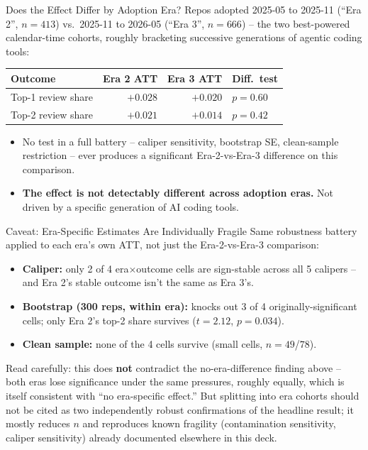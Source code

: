 \begin{frame}{Does the Effect Differ by Adoption Era?}
Repos adopted 2025-05 to 2025-11 (``Era 2'', $n{=}413$) vs.\
2025-11 to 2026-05 (``Era 3'', $n{=}666$) -- the two best-powered
calendar-time cohorts, roughly bracketing successive generations of
agentic coding tools:
\begin{table}
\centering
\small
\begin{tabular}{lrrl}
\toprule
Outcome & Era 2 ATT & Era 3 ATT & Diff.\ test \\
\midrule
Top-1 review share & $+0.028$ & $+0.020$ & $p=0.60$ \\
Top-2 review share & $+0.021$ & $+0.014$ & $p=0.42$ \\
\bottomrule
\end{tabular}
\end{table}
\begin{itemize}
  \item No test in a full battery -- caliper sensitivity, bootstrap
        SE, clean-sample restriction -- ever produces a significant
        Era-2-vs-Era-3 difference on this comparison.
  \item \textbf{The effect is not detectably different across adoption
        eras.} Not driven by a specific generation of AI coding tools.
\end{itemize}
\end{frame}

\begin{frame}{Caveat: Era-Specific Estimates Are Individually Fragile}
Same robustness battery applied to each era's own ATT, not just the
Era-2-vs-Era-3 comparison:
\begin{itemize}
  \item \textbf{Caliper:} only 2 of 4 era$\times$outcome cells are
        sign-stable across all 5 calipers -- and Era 2's stable
        outcome isn't the same as Era 3's.
  \item \textbf{Bootstrap (300 reps, within era):} knocks out 3 of 4
        originally-significant cells; only Era 2's top-2 share
        survives ($t=2.12$, $p=0.034$).
  \item \textbf{Clean sample:} none of the 4 cells survive (small
        cells, $n{=}49$/$78$).
\end{itemize}
\vspace{0.3em}
Read carefully: this does \textbf{not} contradict the no-era-difference
finding above -- both eras lose significance under the same pressures,
roughly equally, which is itself consistent with ``no era-specific
effect.'' But splitting into era cohorts should not be cited as two
independently robust confirmations of the headline result; it mostly
reduces $n$ and reproduces known fragility (contamination sensitivity,
caliper sensitivity) already documented elsewhere in this deck.
\end{frame}

